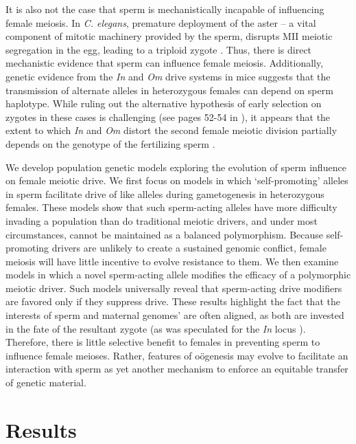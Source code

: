 \documentclass{pnastwo}
\begin{document}
\begin{article}
It is also not the case that sperm is mechanistically incapable of influencing female meiosis.
In \emph{C. elegans}, premature deployment of the aster -- a vital component of mitotic
machinery provided by the sperm, disrupts MII meiotic segregation
in the egg, leading to a triploid zygote \cite{McNally2012}. 
Thus, there is direct mechanistic evidence that sperm can influence female meiosis.
 Additionally, genetic evidence from the \emph{In} and \emph{Om}  drive systems in mice suggests that the 
 transmission of alternate alleles in heterozygous females can depend on sperm haplotype.  
 While ruling out the alternative hypothesis of early selection on zygotes in these cases is challenging (see pages 52-54 in \cite{Burt2006}), it appears that the extent to which \emph{In} and \emph{Om} distort the second female meiotic division partially depends on the genotype of the fertilizing sperm \cite{Agulnik1993,Wu2005}.  


We develop population genetic models exploring the evolution of sperm influence on female meiotic drive. 
We first focus on models in which `self-promoting' alleles in
  sperm facilitate drive of like alleles during gametogenesis in heterozygous females. 
These models show that such sperm-acting alleles 
	have more difficulty invading a population than do traditional meiotic drivers, 
	 and under most circumstances, cannot be maintained as a balanced polymorphism.
Because self-promoting drivers are unlikely to create a sustained genomic conflict, 
	female meiosis will have little incentive to evolve resistance to them.
We then examine models in which a novel sperm-acting allele modifies the efficacy of a polymorphic meiotic driver. 
Such models universally reveal that sperm-acting drive modifiers are favored only if they suppress drive. 
These results highlight the fact that the interests of sperm and maternal  genomes' are often aligned, as both are invested in the fate of the resultant zygote (as was speculated for the \emph{In} locus \cite{Pomiankowski1993}).
Therefore, there is little selective benefit to females in preventing sperm to influence female meioses.
Rather, features of o\"{o}genesis  may evolve to facilitate an interaction with sperm
	as yet another mechanism to enforce an equitable transfer of genetic material.


\section{Results}

\end{article}
\end{document}
